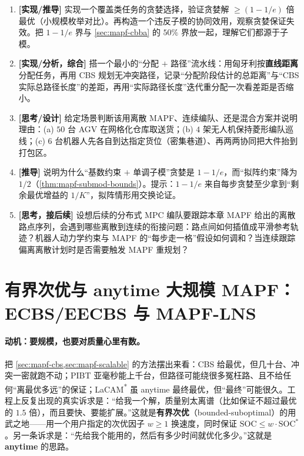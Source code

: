 \begin{exercise}
\begin{enumerate}
  \item \textbf{[实现/推导]} 实现一个覆盖类任务的贪婪选择，验证贪婪解 $\ge (1-1/e)$ 倍最优（小规模枚举对比）。再构造一个违反子模的协同效用，观察贪婪保证失效。把 $1-1/e$ 界与 \cref{sec:mapf-cbba} 的 $50\%$ 界放一起，理解它们都源于子模。
  \item \textbf{[实现/分析，综合]} 搭一个最小的“分配 $+$ 路径”流水线：用匈牙利按\textbf{直线距离}分配任务，再用 CBS 规划无冲突路径，记录“分配阶段估计的总距离”与“CBS 实际总路径长度”的差距，再用“实际路径长度”迭代重分配一次看差距是否缩小。
  \item \textbf{[思考/设计]} 给定场景判断该用离散 MAPF、连续编队、还是混合方案并说明理由：(a) $50$ 台 AGV 在网格化仓库取送货；(b) $4$ 架无人机保持菱形编队巡线；(c) $6$ 台机器人先各自到达指定货位（密集巷道）、再两两协同把大件抬到打包区。
  \item \textbf{[推导]} 说明为什么“基数约束 $+$ 单调子模”贪婪是 $1-1/e$，而“拟阵约束”降为 $1/2$（\cref{thm:mapf-submod-bounds}）。提示：$1-1/e$ 来自每步贪婪至少拿到“剩余最优增益的 $1/K$”，拟阵情形用交换论证。
  \item \textbf{[思考，接后续]} 设想后续的分布式 MPC 编队要跟踪本章 MAPF 给出的离散路点序列，会遇到哪些离散到连续的衔接问题：路点间如何插值成平滑参考轨迹？机器人动力学约束与 MAPF 的“每步走一格”假设如何调和？当连续跟踪偏离离散计划时是否需要触发 MAPF 重规划？
\end{enumerate}
\end{exercise}

\section{有界次优与 anytime 大规模 MAPF：ECBS/EECBS 与 MAPF-LNS}
\label{sec:mapf-bounded}

\paragraph{动机：要规模，也要对质量心里有数。}
把 \cref{sec:mapf-cbs,sec:mapf-scalable} 的方法摆出来看：CBS 给最优，但几十台、冲突一密就跑不动；PIBT 亚毫秒能上千台，但路径可能绕很多冤枉路、且不给任何“离最优多远”的保证；LaCAM\textsuperscript{*} 虽 anytime 最终最优，但“最终”可能很久。工程上反复出现的真实诉求是：“给我一个解，质量别太离谱（比如保证不超过最优的 $1.5$ 倍），而且要快、要能扩展。”这就是\textbf{有界次优}（bounded-suboptimal）的用武之地——用一个用户指定的次优因子 $w\ge 1$ 换速度，同时保证 $\mathrm{SOC}\le w\cdot\mathrm{SOC}^*$。另一条诉求是：“先给我个能用的，然后有多少时间就优化多少。”这就是 \textbf{anytime} 的思路。

